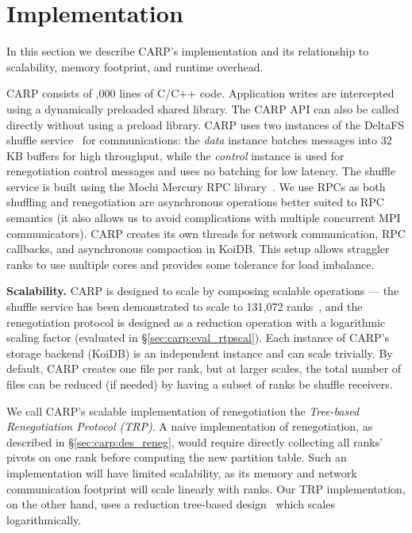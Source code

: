 \section{Implementation}
\label{sec:carp:impl}


In this section we describe CARP's implementation and its relationship to scalability, memory
footprint, and runtime overhead.

\enlargethispage{\baselineskip}
CARP \cite{Jain2024:CARP} consists of ,000 lines of C/C++ code.
Application writes are intercepted using a dynamically preloaded shared library.
The CARP API can also be called directly without using a preload library.
CARP uses two instances of the DeltaFS shuffle service~\cite{Zheng2017} for communications: the
\emph{data} instance batches messages into 32\,KB buffers for high throughput, while the
\emph{control} instance is used for renegotiation control messages and uses no batching for low
latency.
The shuffle service is built using the Mochi \cite{Ross2020:Mochi} Mercury RPC
library~\cite{Souma2013:MercuryRPC}.
We use RPCs as both shuffling and renegotiation are asynchronous operations better suited to RPC
semantics (it also allows us to avoid complications with multiple concurrent MPI communicators).
CARP creates its own threads for network communication, RPC callbacks, and asynchronous compaction
in KoiDB.
This setup allows straggler ranks to use multiple cores and provides some tolerance for load
imbalance.

\textbf{Scalability.
}
CARP is designed to scale by composing scalable operations --- the shuffle service has been
demonstrated to scale to 131,072 ranks~\cite{Zheng2018:DeltaFS}, and the renegotiation protocol is
designed as a reduction operation with a logarithmic scaling factor (evaluated in
\S\ref{sec:carp:eval_rtpscal}).
Each instance of CARP's storage backend (KoiDB) is an independent instance and can scale trivially.
By default, CARP creates one file per rank, but at larger scales, the total number of files can be
reduced (if needed) by having a subset of ranks be shuffle receivers.

We call CARP's scalable implementation of renegotiation the \emph{Tree-based Renegotiation Protocol
  (TRP)}.
A naive implementation of renegotiation, as described in \S\ref{sec:carp:des_reneg}, would require
directly collecting all ranks' pivots on one rank before computing the new partition table.
Such an implementation will have limited scalability, as its memory and network communication
footprint will scale linearly with ranks.
Our TRP implementation, on the other hand, uses a reduction tree-based
design~\cite{Raben2004:OptimizationCollectiveReduction, Raben2004:MoreEfficientReduction} which
scales logarithmically.

